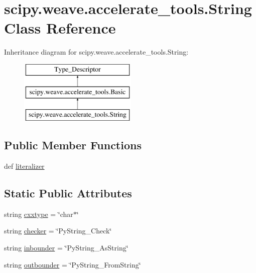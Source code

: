 \hypertarget{classscipy_1_1weave_1_1accelerate__tools_1_1String}{}\section{scipy.\+weave.\+accelerate\+\_\+tools.\+String Class Reference}
\label{classscipy_1_1weave_1_1accelerate__tools_1_1String}
Inheritance diagram for scipy.\+weave.\+accelerate\+\_\+tools.\+String\+:\begin{figure}[H]
\begin{center}
\leavevmode
\includegraphics[height=3.000000cm]{classscipy_1_1weave_1_1accelerate__tools_1_1String}
\end{center}
\end{figure}
\subsection*{Public Member Functions}
\begin{DoxyCompactItemize}
\item 
def \hyperlink{classscipy_1_1weave_1_1accelerate__tools_1_1String_aa41712f564aa14dbd0b759432eea2f8a}{literalizer}
\end{DoxyCompactItemize}
\subsection*{Static Public Attributes}
\begin{DoxyCompactItemize}
\item 
string \hyperlink{classscipy_1_1weave_1_1accelerate__tools_1_1String_ac60a91df86cc739c49b0367ed7083448}{cxxtype} = \char`\"{}char$\ast$\char`\"{}
\item 
string \hyperlink{classscipy_1_1weave_1_1accelerate__tools_1_1String_ae03f6ee06aa2f112cbc216df262736d3}{checker} = \char`\"{}Py\+String\+\_\+\+Check\char`\"{}
\item 
string \hyperlink{classscipy_1_1weave_1_1accelerate__tools_1_1String_a6ee3b38aa7415e19a3682bbf01d54995}{inbounder} = \char`\"{}Py\+String\+\_\+\+As\+String\char`\"{}
\item 
string \hyperlink{classscipy_1_1weave_1_1accelerate__tools_1_1String_aa296dcc9d4ee8f095f26ceb618e15a10}{outbounder} = \char`\"{}Py\+String\+\_\+\+From\+String\char`\"{}
\end{DoxyCompactItemize}


